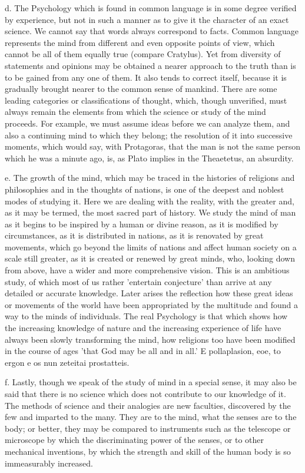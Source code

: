 d. The Psychology which is found in common language is in some degree
verified by experience, but not in such a manner as to give it
the character of an exact science. We cannot say that words always
correspond to facts. Common language represents the mind from different
and even opposite points of view, which cannot be all of them equally
true (compare Cratylus). Yet from diversity of statements and opinions
may be obtained a nearer approach to the truth than is to be gained
from any one of them. It also tends to correct itself, because it is
gradually brought nearer to the common sense of mankind. There are
some leading categories or classifications of thought, which, though
unverified, must always remain the elements from which the science or
study of the mind proceeds. For example, we must assume ideas before we
can analyze them, and also a continuing mind to which they belong;
the resolution of it into successive moments, which would say, with
Protagoras, that the man is not the same person which he was a minute
ago, is, as Plato implies in the Theaetetus, an absurdity.

e. The growth of the mind, which may be traced in the histories of
religions and philosophies and in the thoughts of nations, is one of the
deepest and noblest modes of studying it. Here we are dealing with the
reality, with the greater and, as it may be termed, the most sacred part
of history. We study the mind of man as it begins to be inspired by a
human or divine reason, as it is modified by circumstances, as it is
distributed in nations, as it is renovated by great movements, which go
beyond the limits of nations and affect human society on a scale still
greater, as it is created or renewed by great minds, who, looking down
from above, have a wider and more comprehensive vision. This is an
ambitious study, of which most of us rather 'entertain conjecture'
than arrive at any detailed or accurate knowledge. Later arises the
reflection how these great ideas or movements of the world have
been appropriated by the multitude and found a way to the minds of
individuals. The real Psychology is that which shows how the increasing
knowledge of nature and the increasing experience of life have always
been slowly transforming the mind, how religions too have been modified
in the course of ages 'that God may be all and in all.' E pollaplasion,
eoe, to ergon e os nun zeteitai prostatteis.

f. Lastly, though we speak of the study of mind in a special sense, it
may also be said that there is no science which does not contribute to
our knowledge of it. The methods of science and their analogies are new
faculties, discovered by the few and imparted to the many. They are
to the mind, what the senses are to the body; or better, they may be
compared to instruments such as the telescope or microscope by which the
discriminating power of the senses, or to other mechanical inventions,
by which the strength and skill of the human body is so immeasurably
increased.

